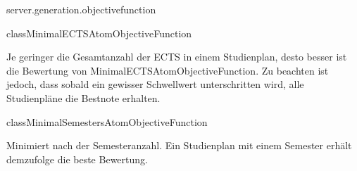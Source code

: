 \begin{texdocpackage}{server.generation.objectivefunction}
\begin{texdocclass}{class}{MinimalECTSAtomObjectiveFunction}
\label{texdoclet:edu.kit.informatik.studyplan.server.generation.objectivefunction.MinimalECTSAtomObjectiveFunction}
\begin{texdocclassintro}
Je geringer die Gesamtanzahl der ECTS in einem Studienplan, desto besser ist
 die Bewertung von MinimalECTSAtomObjectiveFunction. Zu beachten ist jedoch,
 dass sobald ein gewisser Schwellwert unterschritten wird, alle Studienpläne
 die Bestnote erhalten.\end{texdocclassintro}
\begin{texdocclassconstructors}
\end{texdocclassconstructors}
\begin{texdocclassmethods}
\end{texdocclassmethods}
\end{texdocclass}


\begin{texdocclass}{class}{MinimalSemestersAtomObjectiveFunction}
\label{texdoclet:edu.kit.informatik.studyplan.server.generation.objectivefunction.MinimalSemestersAtomObjectiveFunction}
\begin{texdocclassintro}
Minimiert nach der Semesteranzahl. Ein Studienplan mit einem Semester erhält 
 demzufolge die beste Bewertung.\end{texdocclassintro}
\begin{texdocclassconstructors}
\end{texdocclassconstructors}
\begin{texdocclassmethods}
\end{texdocclassmethods}
\end{texdocclass}



\end{texdocpackage}
